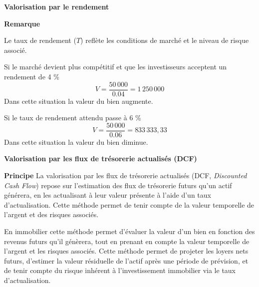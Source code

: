 \documentclass{beamer}
\begin{document}
\begin{frame}{\textbf{Valorisation par le rendement}}
	
\begin{block}{\textbf{Remarque}}

Le taux de rendement (\( T \)) reflète les conditions de marché et le niveau de risque associé. 
\end{block}

\begin{block}

Si le marché devient plus compétitif et que les investisseurs acceptent un rendement de 4 \%
\[ V = \frac{50\,000}{0.04}= 1\,250\,000 \]
Dans cette situation la valeur du bien augmente.

\end{block}
\begin{block}
	
	Si le taux de rendement attendu passe à 6 \%
	\[ V = \frac{50\,000}{0.06}= 833\,333,33 \]
	Dans cette situation la valeur du bien diminue.
	
\end{block}

\end{frame}

\begin{frame}{\textbf{Valorisation par les flux de trésorerie actualisés (DCF)}}
	
	
	\begin{block}{\textbf{Principe}}		
La valorisation par les flux de trésorerie actualisés (DCF, \textit{Discounted Cash Flow}) repose sur l’estimation des flux de trésorerie futurs qu’un actif générera, en les actualisant à leur valeur présente à l’aide d’un taux d’actualisation. Cette méthode permet de tenir compte de la valeur temporelle de l’argent et des risques associés.
	\end{block}
	
\begin{block}

En immobilier cette méthode permet d’évaluer la valeur d’un bien en fonction des revenus futurs qu’il génèrera, tout en prenant en compte la valeur temporelle de l’argent et les risques associés. Cette méthode permet de projeter les loyers nets futurs, d’estimer la valeur résiduelle de l’actif après une période de prévision, et de tenir compte du risque inhérent à l’investissement immobilier via le taux d’actualisation.
\end{block}
	
\end{frame}
\end{document}

